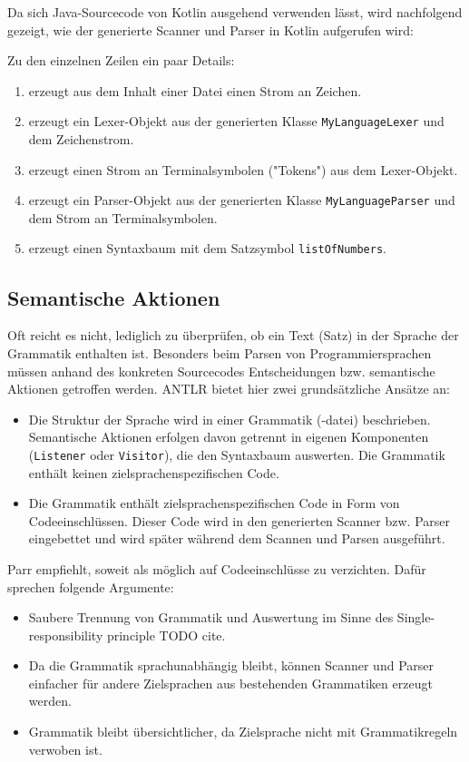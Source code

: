 Da sich Java-Sourcecode von Kotlin ausgehend verwenden lässt, wird nachfolgend gezeigt, wie der generierte Scanner und Parser in Kotlin aufgerufen wird:



Zu den einzelnen Zeilen ein paar Details:
\begin{enumerate}
    \item erzeugt aus dem Inhalt einer Datei einen Strom an Zeichen.
    \item erzeugt ein Lexer-Objekt aus der generierten Klasse \lstinline{MyLanguageLexer} und dem Zeichenstrom.
    \item erzeugt einen Strom an Terminalsymbolen ("Tokens") aus dem Lexer-Objekt.
    \item erzeugt ein Parser-Objekt aus der generierten Klasse \lstinline{MyLanguageParser} und dem Strom an Terminalsymbolen.
    \item erzeugt einen Syntaxbaum mit dem Satzsymbol \lstinline{listOfNumbers}.
\end{enumerate}

\subsection{Semantische Aktionen}

Oft reicht es nicht, lediglich zu überprüfen, ob ein Text (Satz) in der Sprache der Grammatik enthalten ist. Besonders beim Parsen von Programmiersprachen müssen anhand des konkreten Sourcecodes Entscheidungen bzw. semantische Aktionen getroffen werden. ANTLR bietet hier zwei grundsätzliche Ansätze an:

\begin{itemize}
    \item Die Struktur der Sprache wird in einer Grammatik (-datei) beschrieben. Semantische Aktionen erfolgen davon getrennt in eigenen Komponenten (\lstinline{Listener} oder \lstinline{Visitor}), die den Syntaxbaum auswerten. Die Grammatik enthält keinen zielsprachenspezifischen Code.
    \item Die Grammatik enthält zielsprachenspezifischen Code in Form von Codeeinschlüssen. Dieser Code wird in den generierten Scanner bzw. Parser eingebettet und wird später während dem Scannen und Parsen ausgeführt. 
\end{itemize}

Parr empfiehlt, soweit als möglich auf Codeeinschlüsse zu verzichten. Dafür sprechen folgende Argumente:
\begin{itemize}
    \item Saubere Trennung von Grammatik und Auswertung im Sinne des Single-res\-pon\-si\-bi\-li\-ty principle TODO cite.
    \item Da die Grammatik sprachunabhängig bleibt, können Scanner und Parser einfacher für andere Zielsprachen aus bestehenden Grammatiken erzeugt werden.
    \item Grammatik bleibt übersichtlicher, da Zielsprache nicht mit Grammatikregeln verwoben ist.
\end{itemize}


